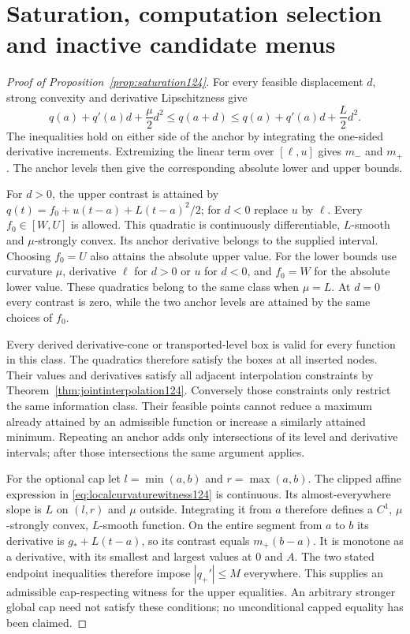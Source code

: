 \section{Saturation, computation selection and inactive candidate menus}
\label{supp:saturation124}

\begin{proof}[Proof of Proposition~\ref{prop:saturation124}]
For every feasible displacement $d$, strong convexity and derivative
Lipschitzness give
\[
 q(a)+q'(a)d+\frac\mu2d^2
 \le q(a+d)\le q(a)+q'(a)d+\frac L2d^2.
\]
The inequalities hold on either side of the anchor by integrating the
one-sided derivative increments. Extremizing the linear term over
$[\ell,u]$ gives $m_-$ and $m_+$. The anchor levels then give the
corresponding absolute lower and upper bounds.

For $d>0$, the upper contrast is attained by
$q(t)=f_0+u(t-a)+L(t-a)^2/2$; for $d<0$ replace $u$ by $\ell$.
Every $f_0\in[W,U]$ is allowed. This quadratic is continuously
differentiable, $L$-smooth and $\mu$-strongly convex. Its anchor
derivative belongs to the supplied interval. Choosing $f_0=U$ also
attains the absolute upper value. For the lower bounds use curvature
$\mu$, derivative $\ell$ for $d>0$ or $u$ for $d<0$, and $f_0=W$
for the absolute lower value. These quadratics belong to the same
class when $\mu=L$. At $d=0$ every contrast is zero, while the two
anchor levels are attained by the same choices of $f_0$.

Every derived derivative-cone or transported-level box is valid for
every function in this class. The quadratics therefore satisfy the
boxes at all inserted nodes. Their values and derivatives satisfy all
adjacent interpolation constraints by Theorem~\ref{thm:jointinterpolation124}.
Conversely those constraints only restrict the same information class.
Their feasible points cannot reduce a maximum already attained by an
admissible function or increase a similarly attained minimum. Repeating
an anchor adds only intersections of its level and derivative intervals;
after those intersections the same argument applies.

For the optional cap let $l=\min(a,b)$ and $r=\max(a,b)$.
The clipped affine expression in
\eqref{eq:localcurvaturewitness124} is continuous. Its almost-everywhere
slope is $L$ on $(l,r)$ and $\mu$ outside. Integrating it from $a$
therefore defines a $C^1$, $\mu$-strongly convex, $L$-smooth function.
On the entire segment from $a$ to $b$ its derivative is
$g_*+L(t-a)$, so its contrast equals $m_+(b-a)$.
It is monotone as a derivative, with its smallest and largest values
at $0$ and $A$. The two stated endpoint inequalities therefore impose
$|q_+'|\le M$ everywhere. This supplies an admissible cap-respecting
witness for the upper equalities. An arbitrary stronger global cap
need not satisfy these conditions; no unconditional capped equality
has been claimed.
\end{proof}

